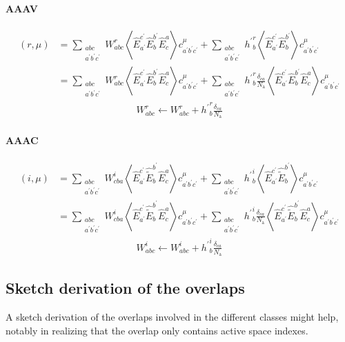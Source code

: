 \documentclass{article}
\newcommand  \equ[2]       {\begin{align}#2\label{#1}\end{align}}
\newcommand  \Expect[1]    {\left\langle  #1 \right\rangle}
\newcommand  \E[2]         {\hat{E}_{#1}^{#2}}
\newcommand  \Et[2]        {\hat{\tilde{E}}_{#1}^{#2}}
\renewcommand\P            {^\prime}
\begin{document}
\paragraph{AAAV}

\equ{ }{
  (r,\mu)&=\sum_{\substack{abc\\ a\P b\P c\P}} W^r_{abc}\Expect{\E{a\P}{c\P}\E{b}{b\P}\E{c}{a}}c_{a\P b\P c\P}^\mu
          +\sum_{\substack{abc\\ a\P b\P c\P}} {h\P}_b^r\Expect{\E{a\P}{c\P}\E{b}{b\P}}        c_{a\P b\P c\P}^\mu
          \nonumber\\&
          =\sum_{\substack{abc\\ a\P b\P c\P}} W^r_{abc}\Expect{\E{a\P}{c\P}\E{b}{b\P}\E{c}{a}}c_{a\P b\P c\P}^\mu
          +\sum_{\substack{abc\\ a\P b\P c\P}} {h\P}_b^r \frac{\delta_{ca}}{N_\text{a}}
                                                        \Expect{\E{a\P}{c\P}\E{b}{b\P}\E{c}{a}}c_{a\P b\P c\P}^\mu
}
\equ{ }{
  W_{abc}^{r}\leftarrow W_{abc}^{r}+{h\P}_b^r \frac{\delta_{ca}}{N_\text{a}}
}

\paragraph{AAAC}

\equ{ }{
  (i,\mu)&=\sum_{\substack{abc\\ a\P b\P c\P}} W^i_{cba}\Expect{\E{a\P}{c\P}\Et{b}{b\P}\E{c}{a}}c_{a\P b\P c\P}^\mu
          +\sum_{\substack{abc\\ a\P b\P c\P}} {h\P}_b^i\Expect{\E{a\P}{c\P}\Et{b}{b\P}}        c_{a\P b\P c\P}^\mu
          \nonumber\\&
          =\sum_{\substack{abc\\ a\P b\P c\P}} W^i_{cba}\Expect{\E{a\P}{c\P}\Et{b}{b\P}\E{c}{a}}c_{a\P b\P c\P}^\mu
          +\sum_{\substack{abc\\ a\P b\P c\P}} {h\P}_b^i \frac{\delta_{ca}}{N_\text{a}}
                                                        \Expect{\E{a\P}{c\P}\Et{b}{b\P}\E{c}{a}}c_{a\P b\P c\P}^\mu
}
\equ{ }{
  W_{abc}^{i}\leftarrow W_{abc}^{i}+{h\P}_b^i \frac{\delta_{ca}}{N_\text{a}}
}

\subsection{Sketch derivation of the overlaps}
\label{sec:derivOverlaps}

A sketch derivation of the overlaps involved in the different classes might help, notably in realizing that the overlap only contains active space indexes.
\end{document}
